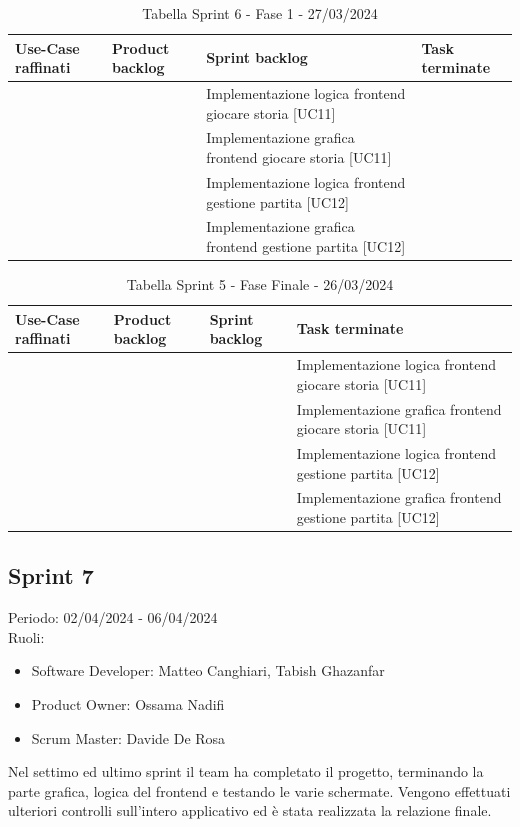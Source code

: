 \documentclass{article}
\begin{document}
\begin{table}[h]
    \centering
    \begin{tabularx}{\textwidth}{|X|X|X|X|}
        \hline
        \bf Use-Case raffinati & \bf Product backlog & \bf Sprint backlog & \bf Task terminate \\
        \hline
        & & Implementazione logica frontend giocare storia [UC11] & \\
        \hline
        & & Implementazione grafica frontend giocare storia [UC11] & \\
        \hline
        & & Implementazione logica frontend gestione partita [UC12] & \\
        \hline
        & & Implementazione grafica frontend gestione partita [UC12] & \\
        \hline
    \end{tabularx}
    \caption*{Tabella Sprint 6 - Fase 1 - 27/03/2024}
\end{table}

\begin{table}[h]
    \centering
    \begin{tabularx}{\textwidth}{|X|X|X|X|}
        \hline
        \bf Use-Case raffinati & \bf Product backlog & \bf Sprint backlog & \bf Task terminate \\
        \hline
        & & & Implementazione logica frontend giocare storia [UC11] \\
        \hline
        & & & Implementazione grafica frontend giocare storia [UC11] \\
        \hline
        & & & Implementazione logica frontend gestione partita [UC12] \\
        \hline
        & & & Implementazione grafica frontend gestione partita [UC12] \\
        \hline
    \end{tabularx}
    \caption*{Tabella Sprint 5 - Fase Finale - 26/03/2024}
\end{table}

\clearpage
\subsection{Sprint 7}
Periodo: 02/04/2024 - 06/04/2024\vspace*{7pt}\\
Ruoli:
\begin{itemize}[label = { }]
    \itemsep0em
    \item Software Developer: Matteo Canghiari, Tabish Ghazanfar 
    \item Product Owner: Ossama Nadifi 
    \item Scrum Master: Davide De Rosa
\end{itemize}
Nel settimo ed ultimo sprint il team ha completato il progetto, terminando la parte grafica, logica del frontend e testando le varie schermate. Vengono effettuati ulteriori controlli sull'intero applicativo ed è stata realizzata la relazione finale.
\end{document}
